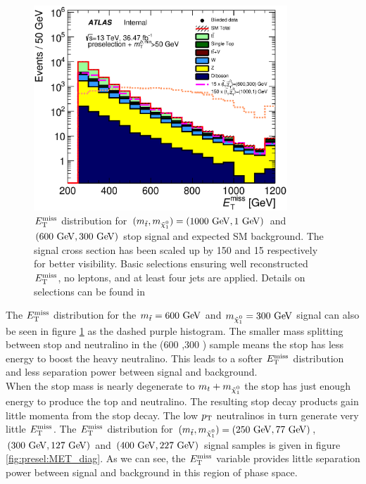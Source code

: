 \begin{figure}[h!]
\centering
    \includegraphics[width=0.85\textwidth]{figures/preselection/Met_preCutSRPlot_withRatio_log.eps}\hspace{0.05\textwidth}
\caption[Stop signal with $m_{\stop}-m_{\ninoone} >> m_t$ and SM background $\met$ distribution after loose preliminary selections for $\met>250 \gev$, zero leptons and at least four jets]{ $\met$ distribution for $(m_{\stop}, m_{\ninoone}) = (1000 \gev,1 \gev)$ and $(600 \gev, 300 \gev)$ stop signal and expected SM background.  The signal cross section has been scaled up by 150 and 15 respectively for better visibility.  Basic selections ensuring well reconstructed $\met$, no leptons, and at least four jets are applied.  Details on selections can be found in \cite{stop0LCONF} }
\label{fig:presel:MET}
\end{figure}

\indent The $\met$ distribution for the $m_{\stop} = 600 \gev$ and $m_{\ninoone} = 300 \gev$ signal can also be seen in figure \ref{fig:presel:MET} as the dashed purple histogram.  The smaller mass splitting between stop and neutralino in the (600 \gev,300 \gev) sample means the stop has less energy to boost the heavy neutralino.  This leads to a softer $\met$ distribution and less separation power between signal and background.  \\

\indent   When the stop mass is nearly degenerate to $m_t + m_{\ninoone}$ the stop has just enough energy to produce the top and neutralino.  The resulting stop decay products gain little momenta from the stop decay. The low $p_{\mathrm{T}}$ neutralinos in turn generate very little $\met$.  The $\met$ distribution for $(m_{\stop}, m_{\ninoone}) = (250 \gev,77 \gev)$, $(300 \gev, 127 \gev)$ and $(400 \gev, 227 \gev)$ signal samples is given in figure \ref{fig:presel:MET_diag}.  As we can see, the $\met$ variable provides little separation power between signal and background in this region of phase space. \\

